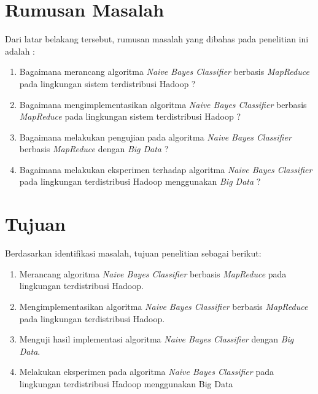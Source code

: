 \section{Rumusan Masalah}
Dari latar belakang tersebut, rumusan masalah yang dibahas pada penelitian ini adalah :
\begin{enumerate}
	\item Bagaimana merancang algoritma {\it Naive Bayes Classifier} berbasis \textit{MapReduce} pada lingkungan sistem terdistribusi Hadoop ?
	\item Bagaimana mengimplementasikan algoritma {\it Naive Bayes Classifier} berbasis \textit{MapReduce} pada lingkungan sistem terdistribusi Hadoop ?
	\item Bagaimana melakukan pengujian pada algoritma \textit{Naive Bayes Classifier} berbasis \textit{MapReduce} dengan \textit{Big Data} ?	
	\item Bagaimana melakukan eksperimen terhadap algoritma \textit{Naive Bayes Classifier} pada lingkungan terdistribusi Hadoop menggunakan \textit{Big Data} ?
\end{enumerate}

\section{Tujuan}
Berdasarkan identifikasi masalah, tujuan penelitian sebagai berikut:
\begin{enumerate}
	\item Merancang algoritma \textit{Naive Bayes Classifier} berbasis \textit{MapReduce} pada lingkungan terdistribusi Hadoop.
	\item Mengimplementasikan algoritma \textit{Naive Bayes Classifier} berbasis \textit{MapReduce} pada lingkungan terdistribusi Hadoop.
	\item Menguji hasil implementasi algoritma \textit{Naive Bayes Classifier} dengan \textit{Big Data}.
	\item Melakukan eksperimen pada algoritma \textit{Naive Bayes Classifier} pada lingkungan terdistribusi Hadoop menggunakan Big Data
\end{enumerate}

